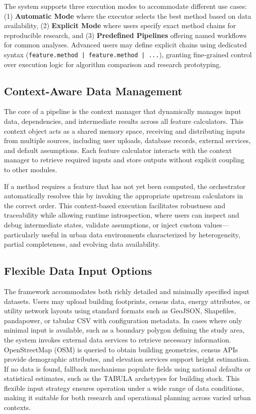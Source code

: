 The system supports three execution modes to accommodate different use cases: (1) \textbf{Automatic Mode} where the executor selects the best method based on data availability, (2) \textbf{Explicit Mode} where users specify exact method chains for reproducible research, and (3) \textbf{Predefined Pipelines} offering named workflows for common analyses. Advanced users may define explicit chains using dedicated syntax (\texttt{feature.method | feature.method | ...}), granting fine-grained control over execution logic for algorithm comparison and research prototyping.

\subsection{Context-Aware Data Management}

The core of a pipeline is the context manager that dynamically manages input data, dependencies, and intermediate results across all feature calculators. This context object acts as a shared memory space, receiving and distributing inputs from multiple sources, including user uploads, database records, external services, and default assumptions. Each feature calculator interacts with the context manager to retrieve required inputs and store outputs without explicit coupling to other modules.

If a method requires a feature that has not yet been computed, the orchestrator automatically resolves this by invoking the appropriate upstream calculators in the correct order. This context-based execution facilitates robustness and traceability while allowing runtime introspection, where users can inspect and debug intermediate states, validate assumptions, or inject custom values---particularly useful in urban data environments characterized by heterogeneity, partial completeness, and evolving data availability.

\subsection{Flexible Data Input Options}

The framework accommodates both richly detailed and minimally specified input datasets. Users may upload building footprints, census data, energy attributes, or utility network layouts using standard formats such as GeoJSON, Shapefiles, pandapower, or tabular CSV with configuration metadata. In cases where only minimal input is available, such as a boundary polygon defining the study area, the system invokes external data services to retrieve necessary information. OpenStreetMap (OSM) is queried to obtain building geometries, census APIs provide demographic attributes, and elevation services support height estimation. If no data is found, fallback mechanisms populate fields using national defaults or statistical estimates, such as the TABULA archetypes for building stock. This flexible input strategy ensures operation under a wide range of data conditions, making it suitable for both research and operational planning across varied urban contexts.


